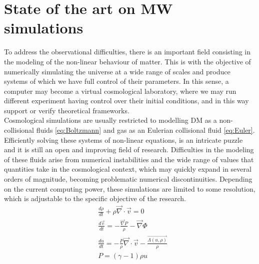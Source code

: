 \section{State of the art on MW simulations}
To address the observational difficulties, there is an important field consisting in the modeling of the non-linear behaviour of matter. 
This is with the objective of numerically simulating the universe at a wide range of scales and produce systems of which we have full control of their parameters. 
In this sense, a computer may become a virtual cosmological laboratory, where we may run different experiment having control over their initial conditions, and in this way support or verify theoretical frameworks. \\


Cosmological simulations are usually restricted to modelling DM as a non-collisional fluids \eqref{eq:Boltzmann} and gas as an Eulerian collisional fluid \eqref{eq:Euler}.  Efficiently solving these systems of non-linear equations, is an intricate puzzle and it is still an open and improving field of research. 
Difficulties in the modeling of these fluids arise from numerical instabilities and the wide range of values that quantities take in the cosmological context, which may quickly expand in several orders of magnitude, becoming problematic numerical discontinuities. Depending on the current computing power, these simulations are limited to some resolution, which is adjustable to the specific objective of the research.\\


\begin{align}
&\frac{d\rho}{dt} + \rho \vec{\nabla}\cdot\vec{v} = 0\\
&\frac{d\vec{v}}{dt} = -\frac{\vec{\nabla}P}{\rho} - \vec{\nabla} \Phi \\
&\frac{du}{dt} = -\frac{P}{\rho}\vec{\nabla}\cdot\vec{v} - \frac{\vec{\Lambda(u,\rho)}}{\rho}\\
& P = (\gamma -1 )\rho u
\label{eq:Euler}
\end{align}


